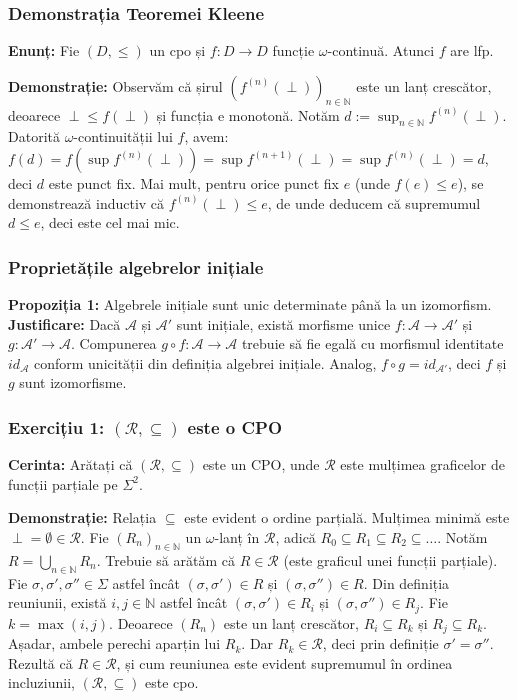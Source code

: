 \subsubsection{Demonstrația Teoremei Kleene}
\textbf{Enunț:} Fie $(D, \leq)$ un cpo și $f: D \to D$ funcție $\omega$-continuă. Atunci $f$ are lfp.

\textbf{Demonstrație:}
Observăm că șirul $(f^{(n)}(\perp))_{n \in \mathbb{N}}$ este un lanț crescător, deoarece $\perp \leq f(\perp)$ și funcția e monotonă. Notăm $d := \sup_{n \in \mathbb{N}} f^{(n)}(\perp)$.
Datorită $\omega$-continuității lui $f$, avem:
$f(d) = f(\sup f^{(n)}(\perp)) = \sup f^{(n+1)}(\perp) = \sup f^{(n)}(\perp) = d$, deci $d$ este punct fix.
Mai mult, pentru orice punct fix $e$ (unde $f(e) \leq e$), se demonstrează inductiv că $f^{(n)}(\perp) \leq e$, de unde deducem că supremumul $d \leq e$, deci este cel mai mic.

\subsubsection{Proprietățile algebrelor inițiale}
\textbf{Propoziția 1:} Algebrele inițiale sunt unic determinate până la un izomorfism.
\textbf{Justificare:} Dacă $\mathcal{A}$ și $\mathcal{A}'$ sunt inițiale, există morfisme unice $f: \mathcal{A} \to \mathcal{A}'$ și $g: \mathcal{A}' \to \mathcal{A}$. Compunerea $g \circ f : \mathcal{A} \to \mathcal{A}$ trebuie să fie egală cu morfismul identitate $id_{\mathcal{A}}$ conform unicității din definiția algebrei inițiale. Analog, $f \circ g = id_{\mathcal{A}'}$, deci $f$ și $g$ sunt izomorfisme.

\subsubsection{Exercițiu 1: $(\mathcal{R}, \subseteq)$ este o CPO}
\textbf{Cerinta:} Arătați că $(\mathcal{R}, \subseteq)$ este un CPO, unde $\mathcal{R}$ este mulțimea graficelor de funcții parțiale pe $\Sigma^2$.

\textbf{Demonstrație:}
Relația $\subseteq$ este evident o ordine parțială. Mulțimea minimă este $\perp = \emptyset \in \mathcal{R}$.
Fie $(R_n)_{n \in \mathbb{N}}$ un $\omega$-lanț în $\mathcal{R}$, adică $R_0 \subseteq R_1 \subseteq R_2 \subseteq \dots$. Notăm $R = \bigcup_{n \in \mathbb{N}} R_n$. Trebuie să arătăm că $R \in \mathcal{R}$ (este graficul unei funcții parțiale).
Fie $\sigma, \sigma', \sigma'' \in \Sigma$ astfel încât $(\sigma, \sigma') \in R$ și $(\sigma, \sigma'') \in R$. Din definiția reuniunii, există $i, j \in \mathbb{N}$ astfel încât $(\sigma, \sigma') \in R_i$ și $(\sigma, \sigma'') \in R_j$. Fie $k = \max(i, j)$. Deoarece $(R_n)$ este un lanț crescător, $R_i \subseteq R_k$ și $R_j \subseteq R_k$. Așadar, ambele perechi aparțin lui $R_k$. Dar $R_k \in \mathcal{R}$, deci prin definiție $\sigma' = \sigma''$. Rezultă că $R \in \mathcal{R}$, și cum reuniunea este evident supremumul în ordinea incluziunii, $(\mathcal{R}, \subseteq)$ este cpo.

